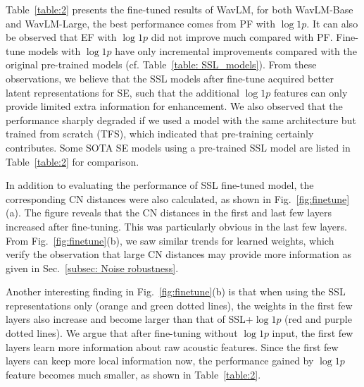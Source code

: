 \documentclass[a4paper]{article}
\begin{document}
Table~\ref{table:2} presents the fine-tuned results of WavLM, for both WavLM-Base and WavLM-Large, the best performance comes from PF with $\log 1p$. It can also be observed that EF with $\log 1p$ did not improve much compared with PF. Fine-tune models with $\log 1p$ have only incremental improvements compared with the original pre-trained models (cf. Table~\ref{table: SSL_models}). From these observations, we believe that the SSL models after fine-tune acquired better latent representations for SE, such that the additional $\log 1p$ features can only provide limited extra information for enhancement. We also observed that the performance  sharply degraded if we used a model with the same architecture but trained from scratch (TFS), which indicated that pre-training certainly contributes. Some SOTA SE models using a pre-trained SSL model are listed in Table~\ref{table:2} for comparison. 

In addition to evaluating the performance of SSL fine-tuned model, the corresponding CN distances were also calculated, as shown in Fig.~\ref{fig:finetune}(a). The figure reveals that the CN distances in the first and last few layers increased after fine-tuning. This was particularly obvious in the last few layers. From Fig.~\ref{fig:finetune}(b), we saw similar trends for learned weights, which verify the observation that large CN distances may provide more information as given in Sec.~\ref{subsec: Noise robustness}. 

Another interesting finding in Fig.~\ref{fig:finetune}(b) is that when using the SSL representations only (orange and green dotted lines), the weights in the first few layers also increase and become larger than that of SSL+$\log 1p$ (red and purple dotted lines). We argue that after fine-tuning without $\log 1p$ input, the first few layers learn more information about raw acoustic features. Since the first few layers can keep more local information now, the performance gained by $\log 1p$ feature becomes much smaller, as shown in Table~\ref{table:2}. 
\end{document}
